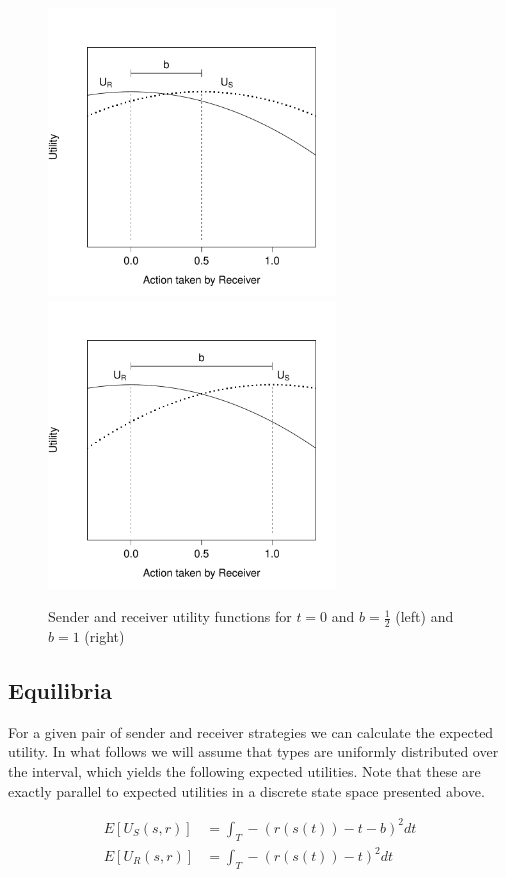 \documentclass[12pt]{article}
\theoremstyle{definition} \newtheorem{definition}{Definition}
\begin{document}
\begin{figure}
\begin{center}
     \includegraphics[width=3in]{payoffgraph2.pdf} \hspace{.5cm} \includegraphics[width=3in]{payoffgraph.pdf}
\end{center}
\caption{Sender and receiver utility functions for $t=0$ and $b=\frac{1}{2}$ (left) and $b=1$ (right)}
\label{receiver_payoff}
\end{figure}

\subsection{Equilibria}

For a given pair of sender and receiver strategies we can calculate the expected utility. In what follows we will assume that types are uniformly distributed over the interval, which yields the following expected utilities. Note that these are exactly parallel to expected utilities in a discrete state space presented above.

\begin{equation}
\begin{split}
     E[U_S(s, r)] &= \int_T -(r(s(t)) - t - b)^2 dt\\
      E[U_R(s, r)] &= \int_T -(r(s(t)) - t)^2 dt
\end{split}
\end{equation}
\end{document}
